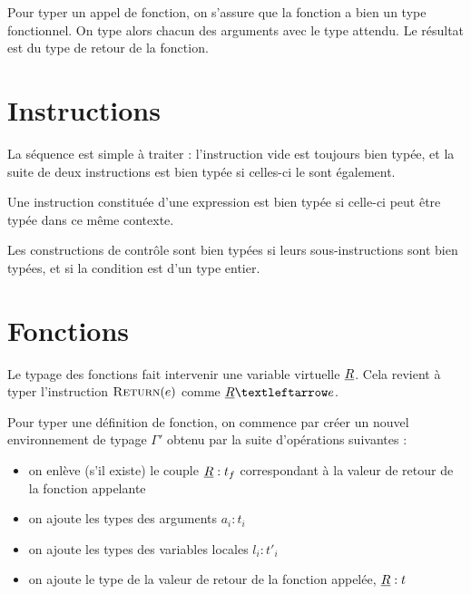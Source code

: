 Pour typer un appel de fonction, on s'assure que la fonction a bien un type
fonctionnel. On type alors chacun des arguments avec le type attendu. Le
résultat est du type de retour de la fonction.

\begin{mathpar}
\end{mathpar}

\section{Instructions}

La séquence est simple à traiter : l'instruction vide est toujours bien typée,
et la suite de deux instructions est bien typée si celles-ci le sont également.

\begin{mathpar}

\end{mathpar}

Une instruction constituée d'une expression est bien typée si celle-ci peut être
typée dans ce même contexte.

\begin{mathpar}
\end{mathpar}

Les constructions de contrôle sont bien typées si leurs sous-instructions sont
bien typées, et si la condition est d'un type entier.

\begin{mathpar}

\end{mathpar}

\section{Fonctions}

Le typage des fonctions fait intervenir une variable virtuelle $\vRet$. Cela
revient à typer l'instruction $\iReturn{e}$ comme $\vRet ← e$.

\begin{mathpar}
\end{mathpar}

Pour typer une définition de fonction, on commence par créer un nouvel
environnement de typage $Γ'$ obtenu par la suite d'opérations suivantes :

\begin{itemize}
\item
  on enlève (s'il existe) le couple $\vRet : t_f$ correspondant à la
  valeur de retour de la fonction appelante
\item
  on ajoute les types des arguments $a_i : t_i$
\item
  on ajoute les types des variables locales $l_i : t'_i$
\item
  on ajoute le type de la valeur de retour de la fonction appelée,
  $\vRet : t$
\end{itemize}

